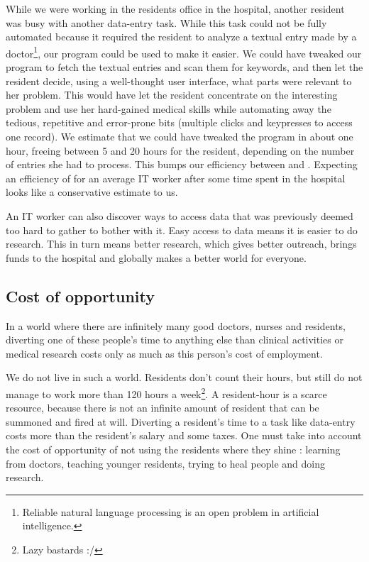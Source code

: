 \documentclass[nobib]{tufte-handout}
\begin{document}
While we were working in the residents office in the hospital, another resident was busy with another data-entry task. While this task could not be fully automated because it required the resident to analyze a textual entry made by a doctor\footnote{Reliable natural language processing is an open problem in artificial intelligence.}, our program could be used to make it easier. We could have tweaked our program to fetch the textual entries and scan them for keywords, and then let the resident decide, using a well-thought user interface, what parts were relevant to her problem. This would have let the resident concentrate on the interesting problem and use her hard-gained medical skills while automating away the tedious, repetitive and error-prone bits (multiple clicks and keypresses to access one record). We estimate that we could have tweaked the program in about one hour, freeing between 5 and 20 hours for the resident, depending on the number of entries she had to process. This bumps our efficiency  between  and . Expecting an efficiency of  for an average IT worker after some time spent in the hospital looks like  a conservative estimate to us.

An IT worker can also discover ways to access data that was previously deemed too hard to gather to bother with it. Easy access to data means it is easier to do research. This in turn means better research, which gives better outreach, brings funds to the hospital and globally makes a better world for everyone. 

\subsection{Cost of opportunity}

In a world where there are infinitely many good doctors, nurses and residents, diverting one of these people's time to anything else than clinical activities or medical research costs only as much as this person's cost of employment.

We do not live in such a world. Residents don't count their hours, but still do not manage to work more
than 120 hours a week\footnote{Lazy bastards :/}. A resident-hour is a scarce resource, because there is not an infinite amount of resident that can be summoned and fired at will. Diverting a resident's time to a task like data-entry costs more than the resident's salary and some taxes. One must take into account the cost of opportunity of not using the residents where they shine : learning from doctors, teaching younger residents, trying to heal people and doing research.
\end{document}
